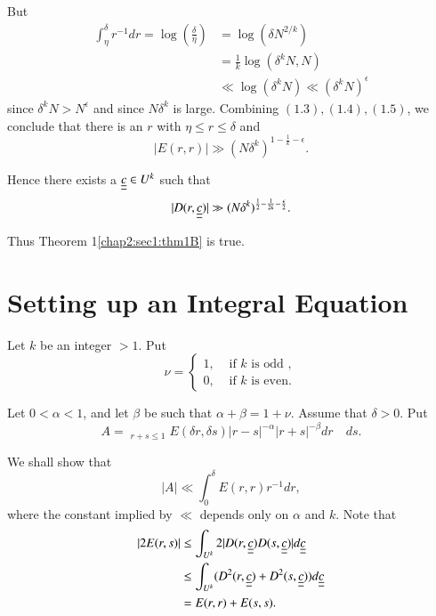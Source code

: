 But
\begin{align*}
\int_{\eta}^{\delta} r^{-1} dr = \log (\frac{\delta}{\eta}) & = \log (\delta N^{2/k})\\
 & = \frac{1}{k} \log (\delta^{k} N, N)\\
 & \ll \log (\delta^{k} N) \ll (\delta^{k} N)^{\epsilon}\tag{1.5}\label{chap2:sec1:eq1.5}
\end{align*}
since $\delta^{k} N > N^{\epsilon}$ and since $N \delta^{k}$ is large. Combining $(1.3), (1.4), (1.5)$, we conclude that there is an $r$ with $\eta \leq r \leq \delta$ and 
$$
|E(r, r)| \gg (N \delta^{k})^{1 - \frac{1}{k} - \epsilon}.
$$

Hence there exists a $\underline{\underline{c}} \in U^{k}$ such that
$$
|D(r, \underline{\underline{c}})| \gg (N \delta^{k})^{\frac{1}{2} - \frac{1}{2k} - \frac{\epsilon}{2}}.
$$\pageoriginale

Thus Theorem 1\ref{chap2:sec1:thm1B} is true.

\section{Setting up an Integral Equation}\label{chap2:sec2}

Let $k$ be an integer $> 1$. Put
\begin{equation*}
 \nu = 
 \begin{cases}
  1, & \text{ if } k \text{ is odd },\\
  0, & \text{ if } k \text{ is even}. 
 \end{cases}
\end{equation*}

Let $0 < \alpha < 1$, and let $\beta$ be such that $\alpha + \beta = 1 + \nu$. Assume that $\delta > 0$. Put
$$
A = \mathop{\int_{0}^{1} \int_{0}^{1}}_{r+s \leq 1} E(\delta r, \delta s) |r-s|^{-\alpha} |r+s|^{-\beta} dr \quad ds.
$$

We shall show that
\begin{equation*}
|A| \ll \int_{0}^{\delta} E(r, r) r^{-1} dr,\tag{2.1}\label{chap2:sec2:eq2.1}
\end{equation*}
where the constant implied by $\ll$ depends only on $\alpha$ and $k$. Note that
\begin{align*}
|2E(r, s)| & \leq \int_{U^{k}} 2|D(r, \underline{\underline{c}}) D(s, \underline{\underline{c}})|d \underline{\underline{c}}\\
& \leq \int_{U^{k}} (D^{2} (r, \underline{\underline{c}}) + D^{2}(s, \underline{\underline{c}})) d \underline{\underline{c}}\\
& = E(r, r) + E(s, s).
\end{align*}

